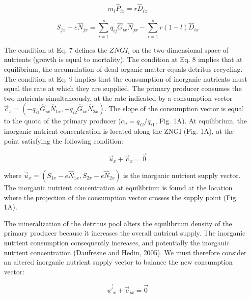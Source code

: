 \documentclass[letterpaper,twocolumn,showkeys]{revtex4-1}
\begin{document}
\begin{equation}
	\label{e:bnet}
	m_{i}\widehat{P}_{ix}=r\widehat{D}_{ix} 
\end{equation}

\begin{equation}
	\label{e:bnet}
	S_{jx}-e\widehat{N}_{jx}=\sum_{i=1}^{s}q_{ij}\widehat{G}_{ix}\widehat{N}_{jx}-\sum_{i=1}^{s}r(1-l)\widehat{D}_{ix}
\end{equation}

The condition at Eq. 7 defines the $ZNGI_i$ on the two-dimensional space of nutrients (growth is equal to mortality). The condition at Eq. 8 implies that at equilibrium, the accumulation of dead organic matter equals detritus recycling. The condition at Eq. 9 implies that the consumption of inorganic nutrients must equal the rate at which they are supplied. The primary producer consumes the two nutrients simultaneously, at the rate indicated by a consumption vector $\overrightarrow{c}_{x} = (-q_{i1}\widehat{G}_{ix}\widehat{N}_{1x},-q_{i2}\widehat{G}_{ix}\widehat{N}_{2x})$. The slope of the consumption vector is equal to the quota of the primary producer ($\alpha_{i}=q_{i2}/q_{i1}$, Fig. 1A). At equilibrium, the inorganic nutrient concentration is located along the ZNGI (Fig. 1A), at the point satisfying the following condition:

\begin{equation}
	\label{e:bnet}
	\overrightarrow{u}_{x}+\overrightarrow{c}_{x}=\overrightarrow{0}
\end{equation}		 	

where $\overrightarrow{u}_{x}=(S_{1x}-e\widehat{N}_{1x},S_{2x}-e\widehat{N}_{2x})$ is the inorganic nutrient supply vector. The inorganic nutrient concentration at equilibrium is found at the location where the projection of the consumption vector crosses the supply point (Fig. 1A). 

	The mineralization of the detritus pool alters the equilibrium density of the primary producer because it increases the overall nutrient supply. The inorganic nutrient consumption consequently increases, and potentially the inorganic nutrient concentration (Daufresne and Hedin, 2005). We must therefore consider an altered inorganic nutrient supply vector to balance the new consumption vector:

\begin{equation}
	\label{e:bnet}
	\overrightarrow{u'}_{x}+\overrightarrow{c}_{ix}=\overrightarrow{0}
\end{equation}
\end{document}
